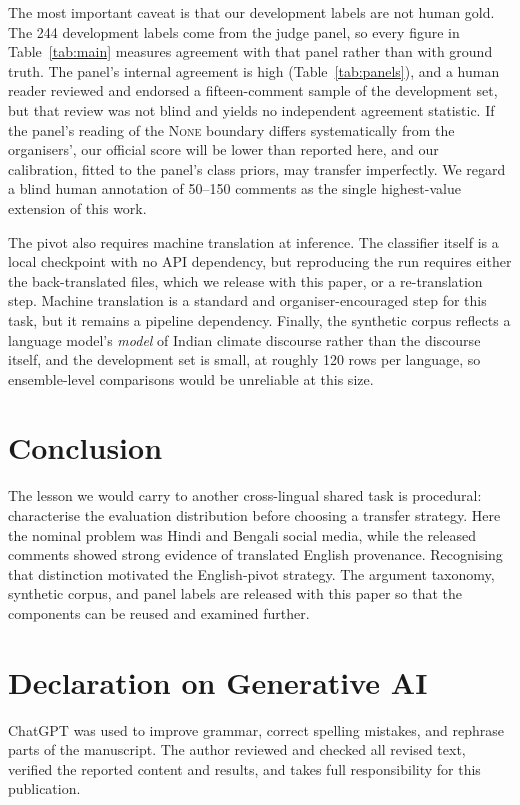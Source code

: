 \documentclass{ceurart}
\begin{document}
The most important caveat is that our development labels are not human gold.
The 244 development labels come from the judge panel, so every figure in
Table~\ref{tab:main} measures agreement with that panel rather than with
ground truth. The panel's internal agreement is high
(Table~\ref{tab:panels}), and a human reader reviewed and endorsed a
fifteen-comment sample of the development set, but that review was not blind
and yields no independent agreement statistic. If the panel's reading of the
\textsc{None} boundary differs systematically from the organisers', our
official score will be lower than reported here, and our calibration, fitted
to the panel's class priors, may transfer imperfectly. We regard a blind
human annotation of 50--150 comments as the single highest-value extension
of this work.

The pivot also requires machine translation at inference. The classifier
itself is a local checkpoint with no API dependency, but reproducing the run
requires either the back-translated files, which we release with this paper,
or a re-translation step. Machine translation is a standard and
organiser-encouraged step for this task, but it remains a pipeline
dependency. Finally, the synthetic corpus reflects a language
model's \emph{model} of Indian climate discourse rather than the discourse
itself, and the development set is small, at roughly 120 rows per language,
so ensemble-level comparisons would be unreliable at this size.

\section{Conclusion}

The lesson we would carry to another cross-lingual shared task is
procedural: characterise the evaluation distribution before choosing a
transfer strategy. Here the nominal problem was Hindi and Bengali social
media, while the released comments showed strong evidence of translated
English provenance. Recognising that distinction motivated the English-pivot
strategy. The argument taxonomy, synthetic corpus, and panel labels are
released with this paper so that the components can be reused and examined
further.

\section*{Declaration on Generative AI}

ChatGPT was used to improve grammar, correct spelling mistakes, and rephrase
parts of the manuscript. The author reviewed and checked all revised text,
verified the reported content and results, and takes full responsibility for
this publication.


\end{document}
